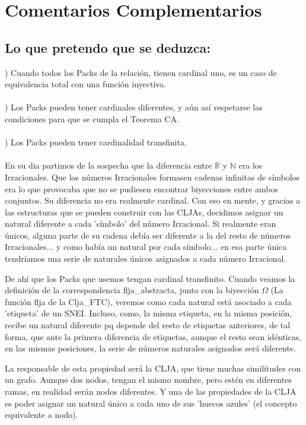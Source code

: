 \chapter[Ordenados por referencias, no por aparición]{Comentarios Complementarios}

\section {Lo que pretendo que se deduzca:}

) Cuando todos los Packs de la relación, tienen cardinal uno, es un caso de equivalencia total con una función inyectiva.\\\\
) Los Packs pueden tener cardinales diferentes, y aún así respetarse las condiciones para que se cumpla el Teorema CA.\\\\
) Los Packs pueden tener cardinalidad transfinita.\\\\

En su dia partimos de la sospecha que la diferencia entre $\mathbb{R}$ y $\mathbb{N}$ era los Irracionales. Que los números Irracionales formasen cadenas infinitas de símbolos era lo que provocaba que no se pudiesen encontrar biyecciones entre ambos conjuntos. Su diferencia no era realmente cardinal. Con eso en mente, y gracias a las estructuras que se pueden construir con las CLJAs, decidimos asignar un natural diferente a cada 'símbolo' del número Irracional. Si realmente eran únicos, alguna parte de su cadena debía ser diferente a la del resto de números Irracionales... y como había un natural por cada símbolo... en esa parte única tendríamos una serie de naturales únicos asignados a cada número Irracional.

De ahí que los Packs que usemos tengan cardinal transfinito. Cuando veamos la definición de la correspondencia flja\_abstracta, junto con la biyección $\Omega$ (La función flja de la Clja\_FTC), veremos como cada natural está asociado a cada 'etiqueta' de un SNEI. Incluso, como, la misma etiqueta, en la misma posición, recibe un natural diferente pq depende del resto de etiquetas anteriores, de tal forma, que ante la primera diferencia de etiquetas, aunque el resto sean idénticas, en las mismas posiciones, la serie de números naturales asignados será diferente.

La responsable de esta propiedad será la CLJA, que tiene muchas similitudes con un grafo. Aunque dos nodos, tengan el mismo nombre, pero estén en diferentes ramas, en realidad serán nodos diferentes. Y una de las propiedades de la CLJA es poder asignar un natural único a cada uno de sus 'huecos azules' (el concepto equivalente a nodo).


